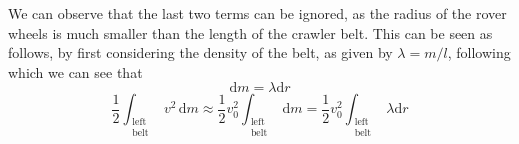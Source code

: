 We can observe that the last two terms can be ignored, as the radius of the rover wheels is much smaller than the length of the crawler belt.
This can be seen as follows, by first considering the density of the belt, as given by \( \lambda = m/l \), following which we can see that
\[
    \text{d}m = \lambda \text{d}r
\]
\begin{equation*}
    \frac{1}{2} \int_{
        \substack{\text{left} \\ \text{belt}}}
    v^2 \, \text{d}m
    \approx
    \frac{1}{2} v_0^2 \int_{
        \substack{\text{left} \\ \text{belt}}}
    \text{d}m
    =
    \frac{1}{2} v_0^2 \int_{
        \substack{\text{left} \\ \text{belt}}}
    \lambda \text{d}r
\end{equation*}
